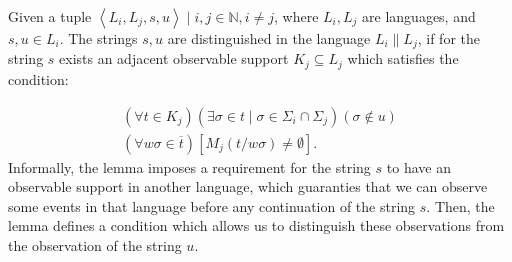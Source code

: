 \documentclass[a4paper, 10pt, conference]{ieeeconf}
\begin{document}
\begin{lemma}
Given a tuple $\left< L_i, L_j, s, u\right> \mid i, j \in \mathbb{N}, i\neq j$,
where $L_i, L_j$ are languages, and $s, u \in L_i$. The strings $s, u$ are
distinguished in the language $L_i \parallel L_j$, if for the string $s$ exists
an adjacent observable support $K_j \subseteq L_j$ which satisfies the
condition:
\end{lemma} 
\begin{equation}
\label{con:distinquished}
	\begin{array}{l}
	 	(\forall t \in K_j)
	 	(\exists \sigma \in t \mid \sigma \in \Sigma_i \cap \Sigma_j)
	 	(\sigma \not \in u)
	 	\\
	 	(\forall w\sigma \in \overline{t})
	 	[M_j(t / w\sigma) \neq \emptyset].
	\end{array}
\end{equation}
Informally, the lemma imposes a requirement for the string $s$ to have an
observable support in another language, which guaranties that we can observe some
events in that language before any continuation of the string $s$.
Then, the lemma defines a condition which allows us to distinguish these
observations from the observation of the string $u$.
\end{document}
